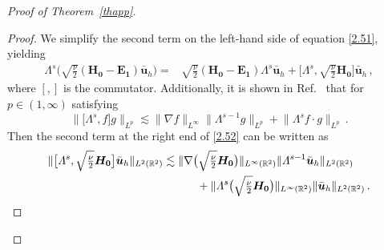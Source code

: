 \documentclass[pdflatex,sn-mathphys-num]{sn-jnl}%
\theoremstyle{thmstyleone}%
\theoremstyle{thmstyletwo}%
\theoremstyle{thmstylethree}%
\theoremstyle{thmstyletwo}
\begin{document}
\begin{proof}[Proof of Theorem~{\upshape\ref{thapp}}]
\begin{proof}
	We simplify the second term on the left-hand side of equation \eqref{2.51}, yielding
	\begin{align}\label{2.52}
		\varLambda^s\big(
		\sqrt{\tfrac{\nu}{2}}
		(\boldsymbol{H_0}
		-\boldsymbol{E_1})
		\bar{\boldsymbol u}_h
		\big)
		=	&	\sqrt{\tfrac{\nu}{2}}
		(\boldsymbol{H_0}
		-\boldsymbol{E_1})\varLambda^s\bar{\boldsymbol u}_h+\big[
		\varLambda^s,\sqrt{\tfrac{\nu}{2}}
		\boldsymbol{H_0}
		\big]	\bar{\boldsymbol u}_h\,,
	\end{align}
	where $[,]$ is the commutator.
	Additionally, it is shown in Ref.~\cite{Kato1988} that for $p\in(1,\infty)$ satisfying 
	\begin{equation}\label{2.53}
		\lVert
		\big[
		\varLambda^s,f
		\big]g
		\rVert_{L^p}
		\lesssim
		\lVert\nabla f\rVert_{L^\infty}
		\lVert
		\varLambda^{s-1}g
		\rVert_{L^p}
		+
		\lVert
		\varLambda^{s}f
		\cdot g\rVert_{L^p}\,.
	\end{equation}
	Then the second term at the right end of \eqref{2.52} can be written as
	\begin{align}\label{2.54}
			\lVert\big[
		\varLambda^s,\sqrt{\tfrac{\nu}{2}}
		\boldsymbol{H_0}
		\big]	\bar{\boldsymbol u}_h\rVert_{L^2(\mathbb{R}^2)}
		&\lesssim	
		\lVert\nabla \big(\sqrt{\tfrac{\nu}{2}}
		\boldsymbol{H_0}
		\big)\rVert_{L^\infty(\mathbb{R}^2)}
		\lVert
		\varLambda^{s-1}\bar{\boldsymbol u}_h
		\rVert_{L^2(\mathbb{R}^2)}\notag\\
		&\qquad\quad+
		\lVert\varLambda^s \big(\sqrt{\tfrac{\nu}{2}}
		\boldsymbol{H_0}
		\big)\rVert_{L^\infty(\mathbb{R}^2)}
		\lVert
		\bar{\boldsymbol u}_h
		\rVert_{L^2(\mathbb{R}^2)}
		\,.
	\end{align}
	

\end{proof}
\end{proof}
\end{document}
